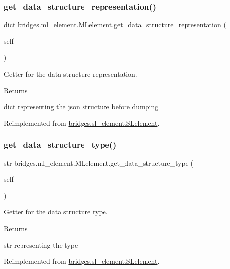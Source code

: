 \subsubsection{\texorpdfstring{get\_data\_structure\_representation()}{get\_data\_structure\_representation()}}
{\footnotesize\ttfamily  dict bridges.\+ml\+\_\+element.\+M\+Lelement.\+get\+\_\+data\+\_\+structure\+\_\+representation (\begin{DoxyParamCaption}\item[{}]{self }\end{DoxyParamCaption})}



Getter for the data structure representation. 

\begin{DoxyReturn}{Returns}


dict representing the json structure before dumping 
\end{DoxyReturn}


Reimplemented from \mbox{\hyperlink{classbridges_1_1sl__element_1_1_s_lelement_adcf1fd38e95d8bbcfa64dac7262c0285}{bridges.\+sl\+\_\+element.\+S\+Lelement}}.

\mbox{\label{classbridges_1_1ml__element_1_1_m_lelement_a756749f461e226ce7ae7e46f6efa48f8}} 
\subsubsection{\texorpdfstring{get\_data\_structure\_type()}{get\_data\_structure\_type()}}
{\footnotesize\ttfamily  str bridges.\+ml\+\_\+element.\+M\+Lelement.\+get\+\_\+data\+\_\+structure\+\_\+type (\begin{DoxyParamCaption}\item[{}]{self }\end{DoxyParamCaption})}



Getter for the data structure type. 

\begin{DoxyReturn}{Returns}


str representing the type 
\end{DoxyReturn}


Reimplemented from \mbox{\hyperlink{classbridges_1_1sl__element_1_1_s_lelement_ae6d1c0479d0ed763e1ea54f5d2f9a0eb}{bridges.\+sl\+\_\+element.\+S\+Lelement}}.

